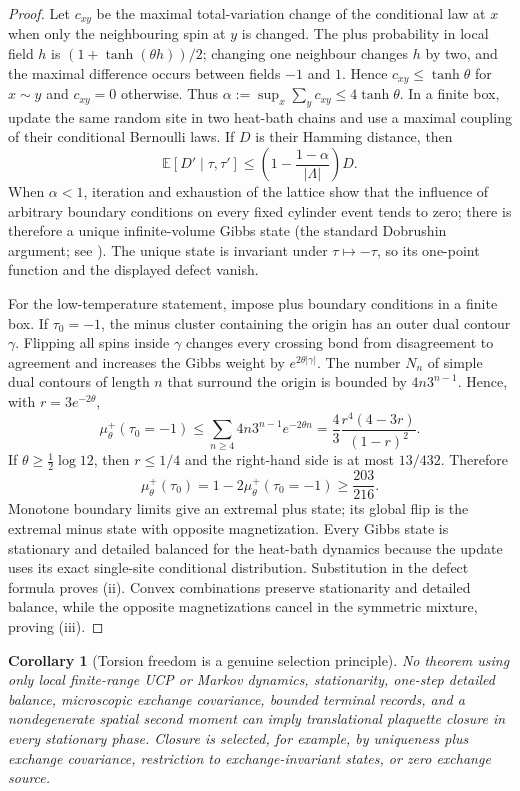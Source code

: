 \documentclass[11pt]{article}
\newtheorem{corollary}[theorem]{Corollary}
\theoremstyle{definition}
\theoremstyle{remark}
\begin{document}
\begin{proof}
Let $c_{xy}$ be the maximal total-variation change of the conditional law at
$x$ when only the neighbouring spin at $y$ is changed.  The plus probability in
local field $h$ is $(1+\tanh(\theta h))/2$; changing one neighbour changes $h$
by two, and the maximal difference occurs between fields $-1$ and $1$.  Hence
$c_{xy}\le\tanh\theta$ for $x\sim y$ and $c_{xy}=0$ otherwise.  Thus
$\alpha:=\sup_x\sum_yc_{xy}\le4\tanh\theta$.  In a finite box, update the same
random site in two heat-bath chains and use a maximal coupling of their
conditional Bernoulli laws.  If $D$ is their Hamming distance, then
\[
 \mathbb E[D'\mid\tau,\tau']
 \le \left(1-\frac{1-\alpha}{|\Lambda|}\right)D.
\]
When $\alpha<1$, iteration and exhaustion of the lattice show that the influence
of arbitrary boundary conditions on every fixed cylinder event tends to zero;
there is therefore a unique infinite-volume Gibbs state (the standard
Dobrushin argument; see \cite{Georgii2011}).  The unique state is invariant under
$\tau\mapsto-\tau$, so its one-point function and the displayed defect vanish.

For the low-temperature statement, impose plus boundary conditions in a finite
box.  If $\tau_0=-1$, the minus cluster containing the origin has an outer dual
contour $\gamma$.  Flipping all spins inside $\gamma$ changes every crossing
bond from disagreement to agreement and increases the Gibbs weight by
$e^{2\theta|\gamma|}$.  The number $N_n$ of simple dual contours of length $n$
that surround the origin is bounded by $4n3^{n-1}$.  Hence, with
$r=3e^{-2\theta}$,
\[
 \mu_{\theta}^{+}(\tau_0=-1)
 \le \sum_{n\ge4}4n3^{n-1}e^{-2\theta n}
 =\frac43\frac{r^4(4-3r)}{(1-r)^2}.
\]
If $\theta\ge\tfrac12\log12$, then $r\le1/4$ and the right-hand side is at most
$13/432$.  Therefore
\[
 \mu_\theta^+(\tau_0)
 =1-2\mu_\theta^+(\tau_0=-1)
 \ge\frac{203}{216}.
\]
Monotone boundary limits give an extremal plus state; its global flip is the
extremal minus state with opposite magnetization.  Every Gibbs state is
stationary and detailed balanced for the heat-bath dynamics because the update
uses its exact single-site conditional distribution.  Substitution in the
defect formula proves (ii).  Convex combinations preserve stationarity and
detailed balance, while the opposite magnetizations cancel in the symmetric
mixture, proving (iii).
\end{proof}

\begin{corollary}[Torsion freedom is a genuine selection principle]
\label{cor:torsion-selection}
No theorem using only local finite-range UCP or Markov dynamics, stationarity,
one-step detailed balance, microscopic exchange covariance, bounded terminal
records, and a nondegenerate spatial second moment can imply translational
plaquette closure in every stationary phase.  Closure is selected, for example,
by uniqueness plus exchange covariance, restriction to exchange-invariant
states, or zero exchange source.
\end{corollary}
\end{document}
